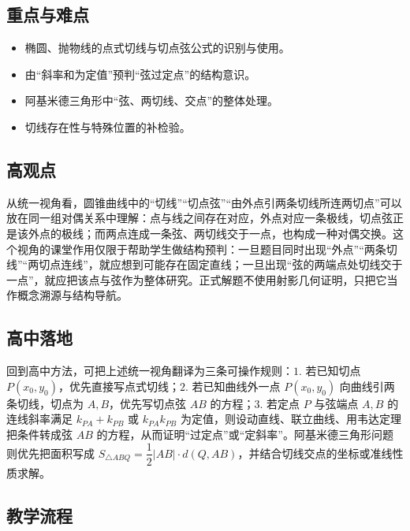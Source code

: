 \documentclass[UTF8,a4paper,11pt]{ctexart}
\begin{document}
\subsection*{重点与难点}

\begin{itemize}

\item 椭圆、抛物线的点式切线与切点弦公式的识别与使用。

\item 由“斜率和为定值”预判“弦过定点”的结构意识。

\item 阿基米德三角形中“弦、两切线、交点”的整体处理。

\item 切线存在性与特殊位置的补检验。

\end{itemize}

\subsection*{高观点}

从统一视角看，圆锥曲线中的“切线”“切点弦”“由外点引两条切线所连两切点”可以放在同一组对偶关系中理解：点与线之间存在对应，外点对应一条极线，切点弦正是该外点的极线；而两点连成一条弦、两切线交于一点，也构成一种对偶交换。这个视角的课堂作用仅限于帮助学生做结构预判：一旦题目同时出现“外点”“两条切线”“两切点连线”，就应想到可能存在固定直线；一旦出现“弦的两端点处切线交于一点”，就应把该点与弦作为整体研究。正式解题不使用射影几何证明，只把它当作概念溯源与结构导航。

\subsection*{高中落地}

回到高中方法，可把上述统一视角翻译为三条可操作规则：$1.$ 若已知切点 $P(x_0,y_0)$，优先直接写点式切线；$2.$ 若已知曲线外一点 $P(x_0,y_0)$ 向曲线引两条切线，切点为 $A,B$，优先写切点弦 $AB$ 的方程；$3.$ 若定点 $P$ 与弦端点 $A,B$ 的连线斜率满足 $k_{PA}+k_{PB}$ 或 $k_{PA}k_{PB}$ 为定值，则设动直线、联立曲线、用韦达定理把条件转成弦 $AB$ 的方程，从而证明“过定点”或“定斜率”。阿基米德三角形问题则优先把面积写成 $S_{\triangle ABQ}=\dfrac{1}{2}|AB|\cdot d(Q,AB)$，并结合切线交点的坐标或准线性质求解。

\subsection*{教学流程}
\end{document}
